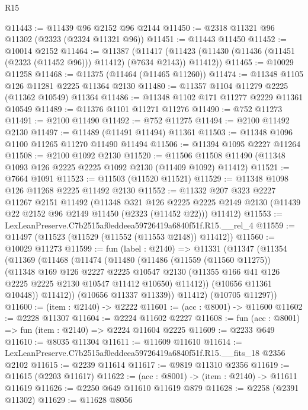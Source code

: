 \begin{lexlean}{R15}
\begin{coremodule}
@11443 := @11439 @96 @2152 @96 @2144
@11450 := @2318 @11321 @96 @11302 (@2323 (@2324 @11321 @96))
@11451 := @11443 @11450
@11452 := @10014 @2152
@11464 := @11387
    (@11417 (@11423 (@11430 (@11436 (@11451 (@2323 (@11452 @96))) @11412) (@7634 @2143)) @11412))
@11465 := @10029 @11258
@11468 := @11375 (@11464 (@11465 @11260))
@11474 := @11348 @1105 @126 @11281 @2225 @11364 @2130
@11480 := @11357 @1104 @11279 @2225 (@11362 @10549) @11364
@11486 := @11348 @1102 @171 @11277 @2229 @11361 @10549
@11489 := @11376 @1101 @11271 @11276
@11490 := @752 @11273
@11491 := @2100 @11490
@11492 := @752 @11275
@11494 := @2100 @11492 @2130
@11497 := @11489 (@11491 @11494) @11361
@11503 := @11348 @1096 @1100 @11265 @11270 @11490 @11494
@11506 := @11394 @1095 @2227 @11264
@11508 := @2100 @1092 @2130
@11520 := @11506 @11508 @11490 (@11348 @1093 @126 @2225 @2225 @1092 @2130 (@11409 @1092) @11412)
@11521 := @7664 @1091
@11523 := @11503 (@11520 @11521)
@11529 := @11348 @1098 @126 @11268 @2225 @11492 @2130
@11552 := @11332
    @207
    @323
    @2227
    @11267
    @2151
    @11492
    (@11348
      @321
      @126
      @2225
      @2225
      @2149
      @2130
      (@11439 @22 @2152 @96 @2149 @11450 (@2323 (@11452 @22)))
      @11412)
@11553 := LexLeanPreserve.C7b2515af0eddeea59726419a6840f51f.R15.__rel_4
@11559 := @11497 (@11523 (@11529 (@11552 (@11553 @2148)) @11412))
@11560 := @10029 @11273
@11599 := fun (label : @2140) =>
  @11331
    (@11347
      (@11354
        (@11369
          (@11468
            (@11474
              (@11480
                (@11486
                  (@11559 (@11560 @11275))
                  (@11348
                    @169
                    @126
                    @2227
                    @2225
                    @10547
                    @2130
                    (@11355 @166 @41 @126 @2225 @2225 @2130 @10547 @11412 @10650)
                    @11412))
                (@10656 @11361 @10448))
              @11412))
          (@10656 @11337 @11339))
        @11412)
      (@10705 @11297))
@11600 := (item : @2140) -> @2222
@11601 := (acc : @8001) -> @11600
@11602 := @2228 @11307
@11604 := @2224 @11602 @2227
@11608 := fun (acc : @8001) => fun (item : @2140) => @2224 @11604 @2225
@11609 := @2233 @649
@11610 := @8035 @11304
@11611 := @11609 @11610
@11614 := LexLeanPreserve.C7b2515af0eddeea59726419a6840f51f.R15.__fits_18 @2356 @2102
@11615 := @2239 @11614
@11617 := @9819 @11310 @2356
@11619 := @11615 (@2203 @11617)
@11622 := (acc : @8001) -> (item : @2140) -> @11611 @11619
@11626 := @2250 @649 @11610 @11619 @879
@11628 := @2258 (@2391 @11302)
@11629 := @11628 @8056

\end{coremodule}
\end{lexlean}
